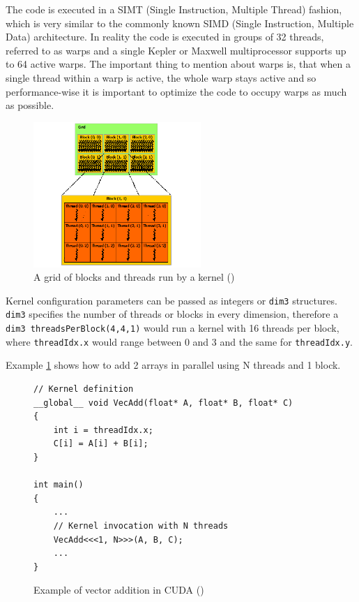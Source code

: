 The code is executed in a SIMT (Single Instruction, Multiple Thread) fashion, which is very similar to the commonly known SIMD (Single Instruction, Multiple Data) architecture. In reality the code is executed in groups of 32 threads, referred to as warps and a single Kepler or Maxwell multiprocessor supports up to 64 active warps. The important thing to mention about warps is, that when a single thread within a warp is active, the whole warp stays active and so performance-wise it is important to optimize the code to occupy warps as much as possible.

\begin{center}
\begin{figure}[h]
	\centering\includegraphics[height=5.5cm]{fig/grid-of-thread-blocks.png}
	\caption{A grid of blocks and threads run by a kernel (\cite{cuda-toolkit-docs})}
\end{figure}
\end{center}

Kernel configuration parameters can be passed as integers or \verb|dim3| structures. \verb|dim3| specifies the number of threads or blocks in every dimension, therefore a \verb|dim3 threadsPerBlock(4,4,1)| would run a kernel with 16 threads per block, where \verb|threadIdx.x| would range between 0 and 3 and the same for \verb|threadIdx.y|.

Example \ref{code:cuda-example} shows how to add 2 arrays in parallel using N threads and 1 block.

\begin{figure}[h]
\begin{verbatim}
// Kernel definition
__global__ void VecAdd(float* A, float* B, float* C)
{
    int i = threadIdx.x;
    C[i] = A[i] + B[i];
}

int main()
{
    ...
    // Kernel invocation with N threads
    VecAdd<<<1, N>>>(A, B, C);
    ...
}
\end{verbatim}

\caption{Example of vector addition in CUDA (\cite{cuda-toolkit-docs})}
\label{code:cuda-example}
\end{figure}

